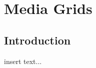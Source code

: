 \graphicspath{{chapt_dutch/}{intro/}{chapt2/}{chapt3/}{chapt4/}{chapt5/}}

\renewcommand\evenpagerightmark{{\scshape\small Chapter 5}}
\renewcommand\oddpageleftmark{{\scshape\small Media Grids}}

\renewcommand{\bibname}{References}

\hyphenation{}

\chapter[Media Grids]%
 {Media Grids}
\label{ch5}

\section{Introduction}
insert text...

\lipsum

\clearpage




\clearpage{\pagestyle{empty}\cleardoublepage}

